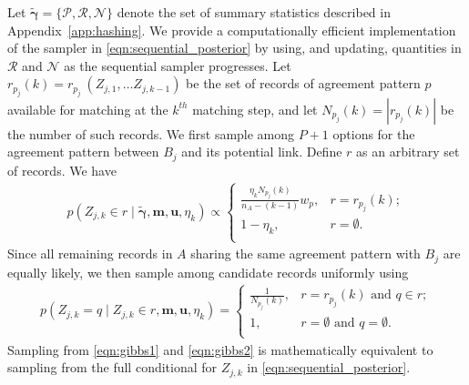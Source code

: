 \documentclass[12pt,letterpaper]{article}
\newcommand{\1}[1]{\mathbb{I}\!\left[#1\right]} %
\begin{document}
Let $\tilde{\bm{\gamma}}=\{ \mathcal{P}, \mathcal{R},\mathcal{N}\}$ denote the set of summary statistics described in Appendix~\ref{app:hashing}. We provide a computationally efficient implementation of the sampler in \eqref{eqn:sequential_posterior} by using, and updating, quantities in $\mathcal{R}$ and $\mathcal{N}$ as the sequential sampler progresses. Let $r_{p_j}(k) = r_{p_j} \ (Z_{j, 1}, \ldots Z_{j, k-1})$ be the set of records of agreement pattern $p$ available for matching at the $k^{th}$ matching step, and let $N_{p_j}(k) = |r_{p_j}(k)|$ be the number of such records. We first sample among $P + 1$ options for the agreement pattern between $B_j$ and its potential link. Define $r$ as an arbitrary set of records. We have
\begin{align}
	\label{eqn:gibbs1}
	p\left( Z_{j, k} \in r \mid \tilde{\bm{\gamma}}, \bm{m}, \bm{u}, \eta_k \right) \propto
	\begin{cases} 
		\frac{\eta_k N_{p_j}(k)}{n_A - (k - 1)}  w_{p},  & r = r_{p_j}(k); \\
		1- \eta_k , &  r = \emptyset. \\
	\end{cases}
\end{align}
Since all remaining records in $A$ sharing the same agreement pattern with $B_j$ are equally likely, we then sample among candidate records uniformly using
\begin{align}
	\label{eqn:gibbs2}
	p\left(Z_{j, k} = q \mid Z_{j, k} \in r, \bm{m}, \bm{u}, \eta_k \right) = \begin{cases} 
		\frac{1}{N_{p_j}(k)}, & r = r_{p_j}(k) \text{ and } q \in r; \\
		1, & r = \emptyset \text{ and } q = \emptyset. \\
	\end{cases}
\end{align}
Sampling from \eqref{eqn:gibbs1} and \eqref{eqn:gibbs2} is mathematically equivalent to sampling from the full conditional for $Z_{j,k}$ in \eqref{eqn:sequential_posterior}.

\end{document}
